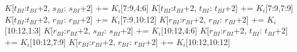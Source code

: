 \begin{algorithm}
{\begin{algorithmic}[l]
     \STATE $K$[$t_{BI}$:$t_{BI}$+2, $s_{BI}$: $s_{BI}$+2] += $K_{i}$[7:9,4:6] \vspace*{1.0ex}
     \STATE $K$[$t_{BI}$:$t_{BI}$+2, $t_{BI}$: $t_{BI}$+2] += $K_{i}$[7:9,7:9] \vspace*{1.0ex}
     \STATE $K$[$t_{BI}$:$t_{BI}$+2, $r_{BI}$: $r_{BI}$+2] += $K_{i}$[7:9,10:12] \vspace*{1.0ex}
     \STATE $K$[$r_{BI}$:$r_{BI}$+2, $r_{BI}$: $r_{BI}$+2] += $K_{i}$[10:12,1:3] \vspace*{1.0ex}
     \STATE $K$[$r_{BI}$:$r_{BI}$+2, $s_{BI}$: $s_{BI}$+2] += $K_{i}$[10:12,4:6] \vspace*{1.0ex}
     \STATE $K$[$r_{BI}$:$r_{BI}$+2, $t_{BI}$: $t_{BI}$+2] += $K_{i}$[10:12,7:9] \vspace*{1.0ex}
    \STATE $K$[$r_{BI}$:$r_{BI}$+2, $r_{BI}$: $r_{BI}$+2] += $K_{i}$[10:12,10:12] \vspace*{1.0ex}	
\ENDFOR

\end{algorithmic}
}
\end{algorithm}

